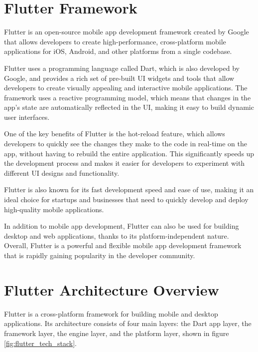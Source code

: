 \documentclass[conference]{IEEEtran}
\begin{document}
\section{Flutter Framework}\label{AA}


Flutter is an open-source mobile app development framework created by Google that allows developers to create high-performance, cross-platform mobile applications for iOS, Android, and other platforms from a single codebase.

Flutter uses a programming language called Dart, which is also developed by Google, and provides a rich set of pre-built UI widgets and tools that allow developers to create visually appealing and interactive mobile applications. The framework uses a reactive programming model, which means that changes in the app's state are automatically reflected in the UI, making it easy to build dynamic user interfaces.

One of the key benefits of Flutter is the hot-reload feature, which allows developers to quickly see the changes they make to the code in real-time on the app, without having to rebuild the entire application. This significantly speeds up the development process and makes it easier for developers to experiment with different UI designs and functionality.

Flutter is also known for its fast development speed and ease of use, making it an ideal choice for startups and businesses that need to quickly develop and deploy high-quality mobile applications.

In addition to mobile app development, Flutter can also be used for building desktop and web applications, thanks to its platform-independent nature. Overall, Flutter is a powerful and flexible mobile app development framework that is rapidly gaining popularity in the developer community.

\section{Flutter Architecture Overview}

Flutter is a cross-platform framework for building mobile and desktop applications. Its architecture consists of four main layers: the Dart app layer, the framework layer, the engine layer, and the platform layer, shown in figure \ref{fig:flutter_tech_stack}.
\end{document}
